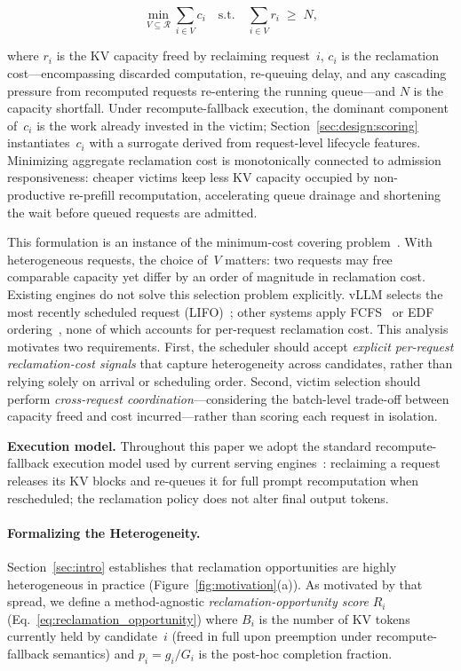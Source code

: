 \documentclass[sigconf,nonacm]{acmart}
\begin{document}
\begin{equation}\label{eq:victim}
  \min_{V \subseteq \mathcal{R}} \sum_{i \in V} c_i
  \quad \text{s.t.} \quad
  \sum_{i \in V} r_i \;\geq\; N,
\end{equation}

\noindent
where $r_i$ is the KV capacity freed by reclaiming request~$i$, $c_i$ is the
reclamation cost---encompassing discarded computation, re-queuing delay,
and any cascading pressure from recomputed requests re-entering the running
queue---and $N$ is the capacity shortfall.  Under recompute-fallback execution,
the dominant component of~$c_i$ is the work already invested in the victim;
Section~\ref{sec:design:scoring} instantiates~$c_i$ with a surrogate derived
from request-level lifecycle features.
Minimizing aggregate reclamation cost is monotonically connected to admission
responsiveness: cheaper victims keep less KV capacity occupied by
non-productive re-prefill recomputation, accelerating queue drainage and
shortening the wait before queued requests are admitted.

This formulation is an instance of the minimum-cost covering
problem~\cite{Kellerer2004}.  With heterogeneous requests, the choice of~$V$
matters: two requests may free comparable capacity yet differ by an order of
magnitude in reclamation cost.
Existing engines do not solve this selection problem explicitly.  vLLM selects
the most recently scheduled request (LIFO)~\cite{Kwon2023}; other systems apply
FCFS~\cite{Yu2022} or EDF ordering~\cite{Gujarati2020}, none of which accounts
for per-request reclamation cost.  This
analysis motivates two requirements.  First, the scheduler should accept
\emph{explicit per-request reclamation-cost signals} that capture
heterogeneity across candidates, rather than relying solely on arrival or
scheduling order.  Second, victim selection should perform \emph{cross-request
coordination}---considering the batch-level trade-off between capacity freed
and cost incurred---rather than scoring each request in isolation.

\noindent\textbf{Execution model.}  Throughout this paper we adopt the
standard recompute-fallback execution model used by current serving
engines~\cite{Kwon2023}: reclaiming a request releases its KV blocks and
re-queues it for full prompt recomputation when rescheduled; the reclamation
policy does not alter final output tokens.

\paragraph{Formalizing the Heterogeneity.}
Section~\ref{sec:intro} establishes that reclamation opportunities are
highly heterogeneous in practice (Figure~\ref{fig:motivation}(a)).
As motivated by that spread, we define a method-agnostic
\emph{reclamation-opportunity score} $R_i$ (Eq.~\ref{eq:reclamation_opportunity})
where $B_i$ is the number of KV tokens currently held by candidate~$i$
(freed in full upon preemption under recompute-fallback
semantics) and $p_i = g_i / G_i$ is the post-hoc completion fraction.
\end{document}
